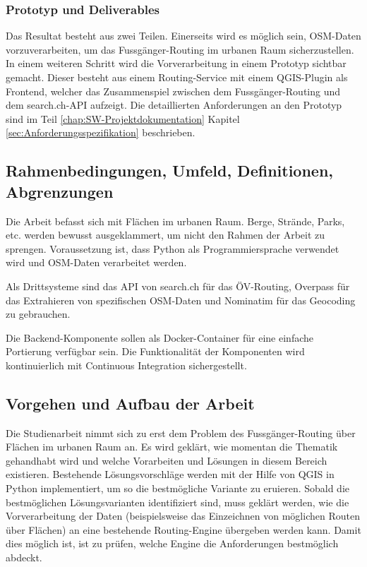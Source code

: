 \subsubsection{Prototyp und Deliverables}
\label{target:Prototyp und Deliverables}
Das Resultat besteht aus zwei Teilen. Einerseits wird es möglich sein, \ac{OSM}-Daten vorzuverarbeiten, um das Fussgänger-Routing im urbanen Raum sicherzustellen. In einem weiteren Schritt wird die Vorverarbeitung in einem Prototyp sichtbar gemacht. Dieser besteht aus einem Routing-Service mit einem QGIS-Plugin als Frontend, welcher das Zusammenspiel zwischen dem Fussgänger-Routing und dem search.ch-\acs{API} aufzeigt. Die detaillierten Anforderungen an den Prototyp sind im Teil \ref{chap:SW-Projektdokumentation} Kapitel \ref{sec:Anforderungsspezifikation} beschrieben.
	
\subsection{Rahmenbedingungen, Umfeld, Definitionen, Abgrenzungen}
\label{Rahmenbedingungen, Umfeld, Definitionen, Abgrenzungen}
Die Arbeit befasst sich mit Flächen im urbanen Raum. Berge, Strände, Parks, etc. werden bewusst ausgeklammert, um nicht den Rahmen der Arbeit zu sprengen. Voraussetzung ist, dass Python als Programmiersprache verwendet wird und \ac{OSM}-Daten \cite{osm_data_switzerland} verarbeitet werden.

Als Drittsysteme sind das \ac{API} von search.ch \cite{search_ch_route_api} für das ÖV-Routing, Overpass \cite{wiki:overpass} für das Extrahieren von spezifischen \ac{OSM}-Daten und Nominatim \cite{nominatim_osm} für das \gls{Geocoding} zu gebrauchen.

Die Backend-Komponente sollen als Docker-Container für eine einfache Portierung verfügbar sein. Die Funktionalität der Komponenten wird kontinuierlich mit Continuous Integration sichergestellt.

\subsection{Vorgehen und Aufbau der Arbeit}
\label{Vorgehen und Aufbau der Arbeit}
Die Studienarbeit nimmt sich zu erst dem Problem des Fussgänger-Routing über Flächen im urbanen Raum an. Es wird geklärt, wie momentan die Thematik gehandhabt wird und welche Vorarbeiten und Lösungen in diesem Bereich existieren. Bestehende Lösungsvorschläge werden mit der Hilfe von QGIS in Python implementiert, um so die bestmögliche Variante zu eruieren. Sobald die bestmöglichen Lösungsvarianten identifiziert sind, muss geklärt werden, wie die Vorverarbeitung der Daten (beispielsweise das Einzeichnen von möglichen Routen über Flächen) an eine bestehende Routing-Engine übergeben werden kann. Damit dies möglich ist, ist zu prüfen, welche Engine die Anforderungen bestmöglich abdeckt.

